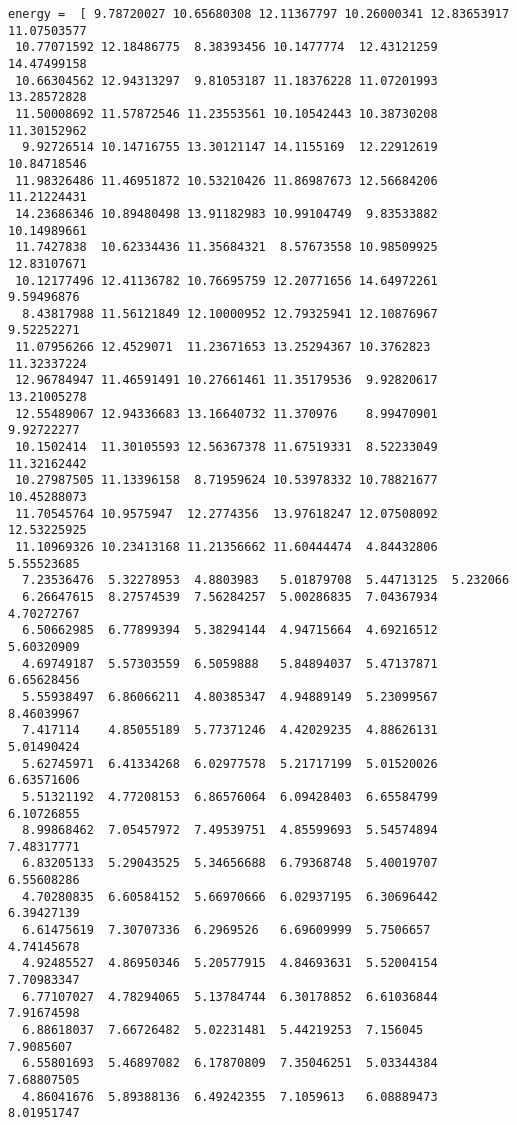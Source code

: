 \documentclass[11pt]{article}
\begin{document}
    \begin{Verbatim}[commandchars=\\\{\}]
energy =  [ 9.78720027 10.65680308 12.11367797 10.26000341 12.83653917 11.07503577
 10.77071592 12.18486775  8.38393456 10.1477774  12.43121259 14.47499158
 10.66304562 12.94313297  9.81053187 11.18376228 11.07201993 13.28572828
 11.50008692 11.57872546 11.23553561 10.10542443 10.38730208 11.30152962
  9.92726514 10.14716755 13.30121147 14.1155169  12.22912619 10.84718546
 11.98326486 11.46951872 10.53210426 11.86987673 12.56684206 11.21224431
 14.23686346 10.89480498 13.91182983 10.99104749  9.83533882 10.14989661
 11.7427838  10.62334436 11.35684321  8.57673558 10.98509925 12.83107671
 10.12177496 12.41136782 10.76695759 12.20771656 14.64972261  9.59496876
  8.43817988 11.56121849 12.10000952 12.79325941 12.10876967  9.52252271
 11.07956266 12.4529071  11.23671653 13.25294367 10.3762823  11.32337224
 12.96784947 11.46591491 10.27661461 11.35179536  9.92820617 13.21005278
 12.55489067 12.94336683 13.16640732 11.370976    8.99470901  9.92722277
 10.1502414  11.30105593 12.56367378 11.67519331  8.52233049 11.32162442
 10.27987505 11.13396158  8.71959624 10.53978332 10.78821677 10.45288073
 11.70545764 10.9575947  12.2774356  13.97618247 12.07508092 12.53225925
 11.10969326 10.23413168 11.21356662 11.60444474  4.84432806  5.55523685
  7.23536476  5.32278953  4.8803983   5.01879708  5.44713125  5.232066
  6.26647615  8.27574539  7.56284257  5.00286835  7.04367934  4.70272767
  6.50662985  6.77899394  5.38294144  4.94715664  4.69216512  5.60320909
  4.69749187  5.57303559  6.5059888   5.84894037  5.47137871  6.65628456
  5.55938497  6.86066211  4.80385347  4.94889149  5.23099567  8.46039967
  7.417114    4.85055189  5.77371246  4.42029235  4.88626131  5.01490424
  5.62745971  6.41334268  6.02977578  5.21717199  5.01520026  6.63571606
  5.51321192  4.77208153  6.86576064  6.09428403  6.65584799  6.10726855
  8.99868462  7.05457972  7.49539751  4.85599693  5.54574894  7.48317771
  6.83205133  5.29043525  5.34656688  6.79368748  5.40019707  6.55608286
  4.70280835  6.60584152  5.66970666  6.02937195  6.30696442  6.39427139
  6.61475619  7.30707336  6.2969526   6.69609999  5.7506657   4.74145678
  4.92485527  4.86950346  5.20577915  4.84693631  5.52004154  7.70983347
  6.77107027  4.78294065  5.13784744  6.30178852  6.61036844  7.91674598
  6.88618037  7.66726482  5.02231481  5.44219253  7.156045    7.9085607
  6.55801693  5.46897082  6.17870809  7.35046251  5.03344384  7.68807505
  4.86041676  5.89388136  6.49242355  7.1059613   6.08889473  8.01951747

\end{Verbatim}
\end{document}
